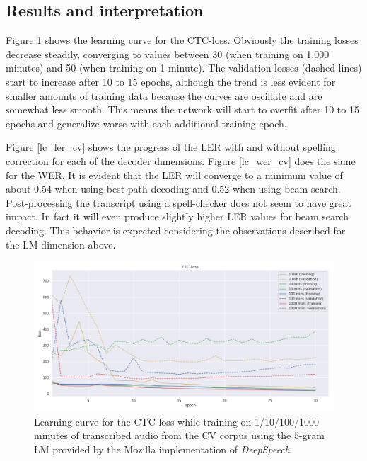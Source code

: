 \subsection{Results and interpretation}

Figure \ref{lc_loss_cv} shows the learning curve for the \ac{CTC}-loss. Obviously the training losses decrease steadily, converging to values between 30 (when training on 1.000 minutes) and 50 (when training on 1 minute). The validation losses (dashed lines) start to increase after 10 to 15 epochs, although the trend is less evident for smaller amounts of training data because the curves are oscillate and are somewhat less smooth. This means the network will start to overfit after 10 to 15 epochs and generalize worse with each additional training epoch.

Figure \ref{lc_ler_cv} shows the progress of the \ac{LER} with and without spelling correction for each of the decoder dimensions. Figure \ref{lc_wer_cv} does the same for the \ac{WER}. It is evident that the \ac{LER} will converge to a minimum value of about 0.54 when using best-path decoding and 0.52 when using beam search. Post-processing the transcript using a spell-checker does not seem to have great impact. In fact it will even produce slightly higher \ac{LER} values for beam search decoding. This behavior is expected considering the observations described for the \ac{LM} dimension above.

\begin{figure}[h!]
	\includegraphics[width=\linewidth]{./img/lc_loss_cv.png}
	\caption{Learning curve for the CTC-loss while training on 1/10/100/1000 minutes of transcribed audio from the \ac{CV} corpus using the $5$-gram \ac{LM} provided by the Mozilla implementation of \textit{DeepSpeech}}
	\label{lc_loss_cv}
\end{figure}

